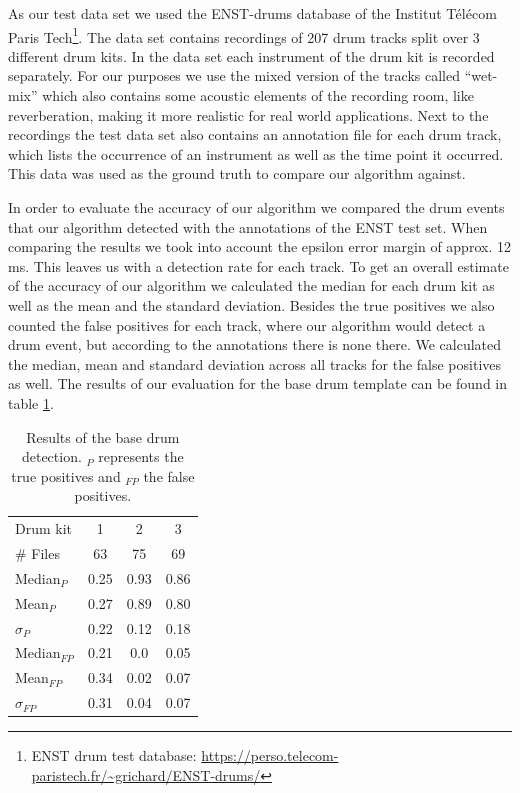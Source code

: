 \documentclass{article}
\begin{document}
As our test data set we used the ENST-drums database of the Institut Télécom Paris Tech\footnote{ENST drum test database: \url{https://perso.telecom-paristech.fr/~grichard/ENST-drums/}}.
The data set contains recordings of 207 drum tracks split over 3 different drum kits.
In the data set each instrument of the drum kit is recorded separately.
For our purposes we use the mixed version of the tracks called ``wet-mix'' which also contains some acoustic elements of the recording room, like reverberation, making it more realistic for real world applications.
Next to the recordings the test data set also contains an annotation file for each drum track, which lists the occurrence of an instrument as well as the time point it occurred.
This data was used as the ground truth to compare our algorithm against.

In order to evaluate the accuracy of our algorithm we compared the drum events that our algorithm detected with the annotations of the ENST test set.
When comparing the results we took into account the epsilon error margin of approx. 12 ms.
This leaves us with a detection rate for each track.
To get an overall estimate of the accuracy of our algorithm we calculated the median for each drum kit as well as the mean and the standard deviation.
Besides the true positives we also counted the false positives for each track, where our algorithm would detect a drum event, but according to the annotations there is none there.
We calculated the median, mean and standard deviation across all tracks for the false positives as well.
The results of our evaluation for the base drum template can be found in table \ref{tab:results}.


\begin{table}[h]
  \centering
  \begin{tabular}{l | c c c}
      Drum kit  &  1 & 2 & 3 \\
      \# Files &   63 &   75 & 69 \\
      \hline
      Median$_{P}$   & 0.25 & 0.93 & 0.86 \\
      Mean$_{P}$     & 0.27 & 0.89 & 0.80 \\
      $\sigma_P$     & 0.22 & 0.12 & 0.18 \\
      \hline
      Median$_{FP}$   & 0.21 & 0.0 & 0.05 \\
      Mean$_{FP}$     & 0.34 & 0.02 & 0.07 \\
      $\sigma_{FP}$   & 0.31 & 0.04 & 0.07 \\
  \end{tabular}
  \caption{Results of the base drum detection. $_P$ represents the true positives and $_{FP}$ the false positives.}
  \label{tab:results}
\end{table}
\end{document}
